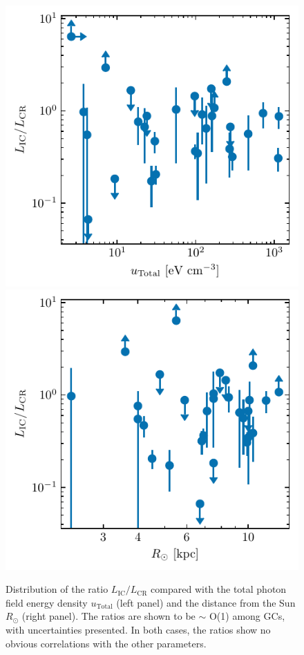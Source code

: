 \documentclass[doublespace,nopageskip]{VTthesis} %
\begin{document}
\begin{appendices}
\begin{figure}
    \centering
    \includegraphics{Figures/Globular/ratio_urad.pdf}
    \includegraphics{Figures/Globular/ratio_Rsun.pdf}
    \caption{Distribution of the ratio $L_\mathrm{IC}/L_\mathrm{CR}$ compared with the total photon field energy density $u_\mathrm{Total}$ (left panel) and the distance from the Sun $R_\odot$ (right panel). The ratios are shown to be $\sim$ O(1) among GCs, with uncertainties presented. In both cases, the ratios show no obvious correlations with the other parameters.}
    \label{fig:fe}
\end{figure}
  

\end{appendices}
\end{document}
